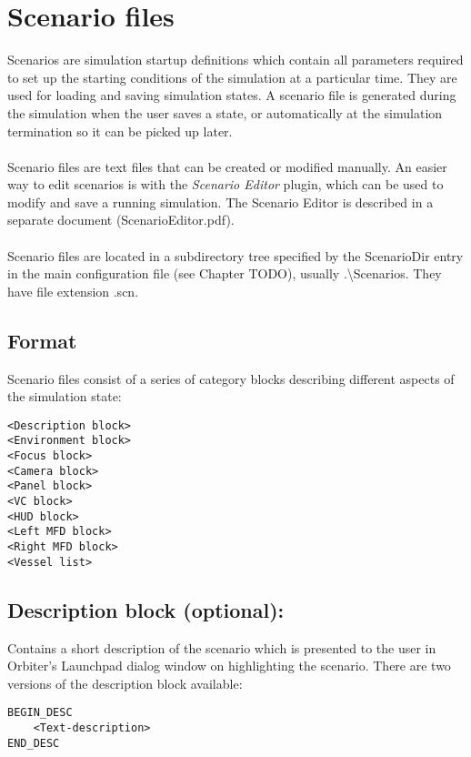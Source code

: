 \documentclass[Orbiter Developer Manual.tex]{subfiles}
\begin{document}
\section{Scenario files}
Scenarios are simulation startup definitions which contain all parameters required to set up the starting conditions of the simulation at a particular time. They are used for loading and saving simulation states. A scenario file is generated during the simulation when the user saves a state, or automatically at the simulation termination so it can be picked up later.\\
\\
Scenario files are text files that can be created or modified manually. An easier way to edit scenarios is with the \textit{Scenario Editor} plugin, which can be used to modify and save a running simulation. The Scenario Editor is described in a separate document (ScenarioEditor.pdf).\\
\\
Scenario files are located in a subdirectory tree specified by the ScenarioDir entry in the main configuration file (see Chapter TODO), usually .\textbackslash Scenarios. They have file extension .scn.


\subsection*{Format}
Scenario files consist of a series of category blocks describing different aspects of the simulation state:

\begin{lstlisting}[language=OSFS]
<Description block>
<Environment block>
<Focus block>
<Camera block>
<Panel block>
<VC block>
<HUD block>
<Left MFD block>
<Right MFD block>
<Vessel list>
\end{lstlisting}


\subsection*{Description block (optional):}
Contains a short description of the scenario which is presented to the user in Orbiter’s Launchpad dialog window on highlighting the scenario. There are two versions of the description block available:

\begin{lstlisting}[language=OSFS]
BEGIN_DESC
	<Text-description>
END_DESC
\end{lstlisting}
\end{document}

